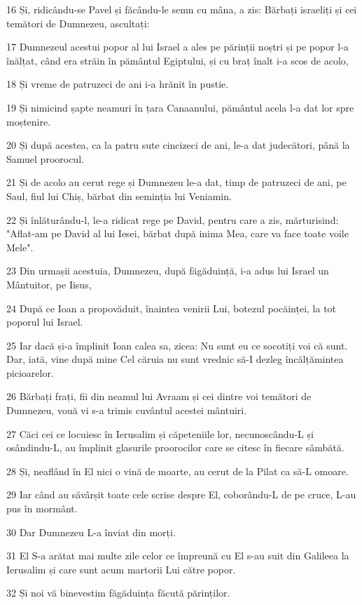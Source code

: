 \par 16 Și, ridicându-se Pavel și făcându-le semn cu mâna, a zis: Bărbați israeliți și cei temători de Dumnezeu, ascultați:
\par 17 Dumnezeul acestui popor al lui Israel a ales pe părinții noștri și pe popor l-a înălțat, când era străin în pământul Egiptului, și cu braț înalt i-a scos de acolo,
\par 18 Și vreme de patruzeci de ani i-a hrănit în pustie.
\par 19 Și nimicind șapte neamuri în țara Canaanului, pământul acela l-a dat lor spre moștenire.
\par 20 Și după acestea, ca la patru sute cincizeci de ani, le-a dat judecători, până la Samuel proorocul.
\par 21 Și de acolo au cerut rege și Dumnezeu le-a dat, timp de patruzeci de ani, pe Saul, fiul lui Chiș, bărbat din seminția lui Veniamin.
\par 22 Și înlăturându-l, le-a ridicat rege pe David, pentru care a zis, mărturisind: "Aflat-am pe David al lui Iesei, bărbat după inima Mea, care va face toate voile Mele".
\par 23 Din urmașii acestuia, Dumnezeu, după făgăduință, i-a adus lui Israel un Mântuitor, pe Iisus,
\par 24 După ce Ioan a propovăduit, înaintea venirii Lui, botezul pocăinței, la tot poporul lui Israel.
\par 25 Iar dacă și-a împlinit Ioan calea sa, zicea: Nu sunt eu ce socotiți voi că sunt. Dar, iată, vine după mine Cel căruia nu sunt vrednic să-I dezleg încălțămintea picioarelor.
\par 26 Bărbați frați, fii din neamul lui Avraam și cei dintre voi temători de Dumnezeu, vouă vi s-a trimis cuvântul acestei mântuiri.
\par 27 Căci cei ce locuiesc în Ierusalim și căpeteniile lor, necunoscându-L și osândindu-L, au împlinit glasurile proorocilor care se citesc în fiecare sâmbătă.
\par 28 Și, neaflând în El nici o vină de moarte, au cerut de la Pilat ca să-L omoare.
\par 29 Iar când au săvârșit toate cele scrise despre El, coborându-L de pe cruce, L-au pus în mormânt.
\par 30 Dar Dumnezeu L-a înviat din morți.
\par 31 El S-a arătat mai multe zile celor ce împreună cu El s-au suit din Galileea la Ierusalim și care sunt acum martorii Lui către popor.
\par 32 Și noi vă binevestim făgăduința făcută părinților.

